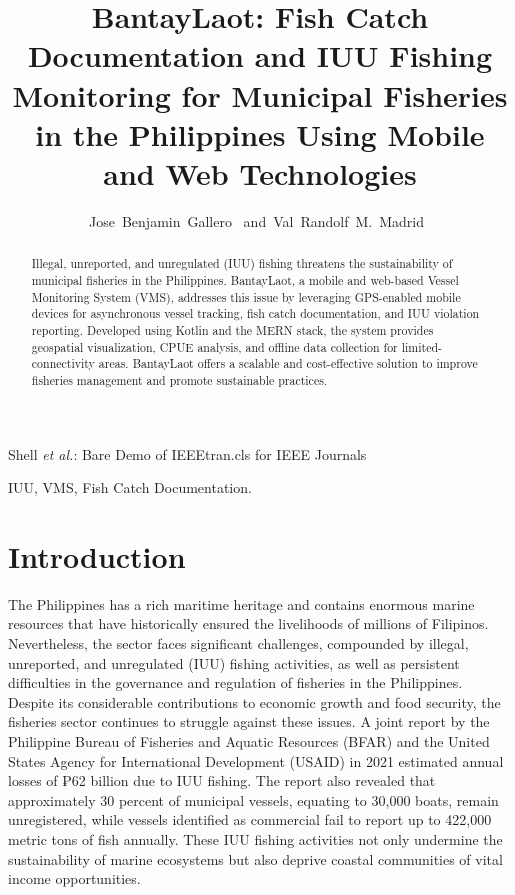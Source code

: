 \documentclass[journal]{IEEEtran}
\begin{document}
\title{BantayLaot: Fish Catch Documentation and IUU Fishing Monitoring for Municipal Fisheries in the Philippines Using Mobile and Web Technologies}


\author{Jose~Benjamin~Gallero~\IEEEmembership
        and~Val~Randolf~M.~Madrid~\IEEEmembership%
}

%
{Shell \MakeLowercase{\textit{et al.}}: Bare Demo of IEEEtran.cls for IEEE Journals}

\maketitle
\begin{abstract}
Illegal, unreported, and unregulated (IUU) fishing threatens the sustainability of municipal fisheries in the Philippines. BantayLaot, a mobile and web-based Vessel Monitoring System (VMS), addresses this issue by leveraging GPS-enabled mobile devices for asynchronous vessel tracking, fish catch documentation, and IUU violation reporting. Developed using Kotlin and the MERN stack, the system provides geospatial visualization, CPUE analysis, and offline data collection for limited-connectivity areas. BantayLaot offers a scalable and cost-effective solution to improve fisheries management and promote sustainable practices.
\end{abstract}

\begin{IEEEkeywords}
IUU, VMS, Fish Catch Documentation.
\end{IEEEkeywords}

\IEEEpeerreviewmaketitle

\section{Introduction}
\IEEEPARstart 
The Philippines has a rich maritime heritage and contains enormous marine resources that have historically ensured the livelihoods of millions of Filipinos. Nevertheless, the sector faces significant challenges, compounded by illegal, unreported, and unregulated (IUU) fishing activities, as well as persistent difficulties in the governance and regulation of fisheries in the Philippines. Despite its considerable contributions to economic growth and food security, the fisheries sector continues to struggle against these issues. A joint report by the Philippine Bureau of Fisheries and Aquatic Resources (BFAR) and the United States Agency for International Development (USAID) in 2021 estimated annual losses of ₱62 billion due to IUU fishing. The report also revealed that approximately 30 percent of municipal vessels, equating to 30,000 boats, remain unregistered, while vessels identified as commercial fail to report up to 422,000 metric tons of fish annually. These IUU fishing activities not only undermine the sustainability of marine ecosystems but also deprive coastal communities of vital income opportunities.
\end{document}
